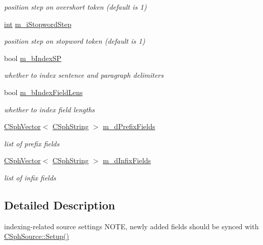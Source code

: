\begin{DoxyCompactItemize}
\begin{DoxyCompactList}\small\item\em position step on overshort token (default is 1) \end{DoxyCompactList}\item 
\hyperlink{sphinxexpr_8cpp_a4a26e8f9cb8b736e0c4cbf4d16de985e}{int} \hyperlink{structCSphSourceSettings_a5b1d0d84201dde3c42108451572b9814}{m\-\_\-i\-Stopword\-Step}
\begin{DoxyCompactList}\small\item\em position step on stopword token (default is 1) \end{DoxyCompactList}\item 
bool \hyperlink{structCSphSourceSettings_ad3dbcf24a7c8128b9d7ffab31d37abfe}{m\-\_\-b\-Index\-S\-P}
\begin{DoxyCompactList}\small\item\em whether to index sentence and paragraph delimiters \end{DoxyCompactList}\item 
bool \hyperlink{structCSphSourceSettings_af4604306126cea026fbbb7501db04705}{m\-\_\-b\-Index\-Field\-Lens}
\begin{DoxyCompactList}\small\item\em whether to index field lengths \end{DoxyCompactList}\item 
\hyperlink{classCSphVector}{C\-Sph\-Vector}$<$ \hyperlink{structCSphString}{C\-Sph\-String} $>$ \hyperlink{structCSphSourceSettings_a4abbec39b930428f81fdc07cb3ae10af}{m\-\_\-d\-Prefix\-Fields}
\begin{DoxyCompactList}\small\item\em list of prefix fields \end{DoxyCompactList}\item 
\hyperlink{classCSphVector}{C\-Sph\-Vector}$<$ \hyperlink{structCSphString}{C\-Sph\-String} $>$ \hyperlink{structCSphSourceSettings_ad96322074dfdf9a6ddd5b7651ab8a43d}{m\-\_\-d\-Infix\-Fields}
\begin{DoxyCompactList}\small\item\em list of infix fields \end{DoxyCompactList}\end{DoxyCompactItemize}


\subsection{Detailed Description}
indexing-\/related source settings N\-O\-T\-E, newly added fields should be synced with \hyperlink{classCSphSource_ab1c4e1f6cb14d7301a37b9ccf9efa0a2}{C\-Sph\-Source\-::\-Setup()} 

